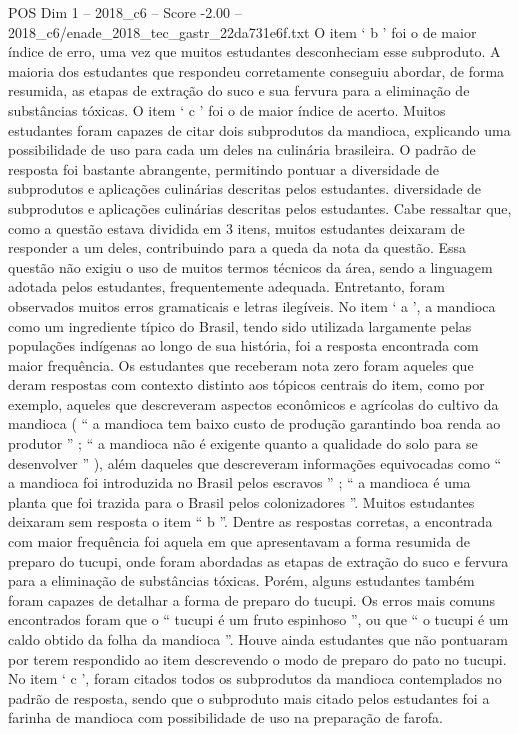 \begin{textsample}{POS Dim 1 – 2018\_c6 – Score -2.00 – 2018\_c6/enade\_2018\_tec\_gastr\_22da731e6f.txt}
O item ‘ b ’ foi o de maior índice de erro, uma vez que muitos estudantes desconheciam esse subproduto.
A maioria dos estudantes que respondeu corretamente conseguiu abordar, de forma resumida, as etapas de extração do suco e sua fervura para a eliminação de substâncias tóxicas.
O item ‘ c ’ foi o de maior índice de acerto.
Muitos estudantes foram capazes de citar dois subprodutos da mandioca, explicando uma possibilidade de uso para cada um deles na culinária brasileira.
O padrão de resposta foi bastante abrangente, permitindo pontuar a diversidade de subprodutos e aplicações culinárias descritas pelos estudantes. diversidade de subprodutos e aplicações culinárias descritas pelos estudantes.
Cabe ressaltar que, como a questão estava dividida em 3 itens, muitos estudantes deixaram de responder a um deles, contribuindo para a queda da nota da questão.
Essa questão não exigiu o uso de muitos termos técnicos da área, sendo a linguagem adotada pelos estudantes, frequentemente adequada.
Entretanto, foram observados muitos erros gramaticais e letras ilegíveis.
No item ‘ a ’, a mandioca como um ingrediente típico do Brasil, tendo sido utilizada largamente pelas populações indígenas ao longo de sua história, foi a resposta encontrada com maior frequência.
Os estudantes que receberam nota zero foram aqueles que deram respostas com contexto distinto aos tópicos centrais do item, como por exemplo, aqueles que descreveram aspectos econômicos e agrícolas do cultivo da mandioca ( “ a mandioca tem baixo custo de produção garantindo boa renda ao produtor ” ; “ a mandioca não é exigente quanto a qualidade do solo para se desenvolver ” ), além daqueles que descreveram informações equivocadas como “ a mandioca foi introduzida no Brasil pelos escravos ” ; “ a mandioca é uma planta que foi trazida para o Brasil pelos colonizadores ”.
Muitos estudantes deixaram sem resposta o item “ b ”.
Dentre as respostas corretas, a encontrada com maior frequência foi aquela em que apresentavam a forma resumida de preparo do tucupi, onde foram abordadas as etapas de extração do suco e fervura para a eliminação de substâncias tóxicas.
Porém, alguns estudantes também foram capazes de detalhar a forma de preparo do tucupi.
Os erros mais comuns encontrados foram que o “ tucupi é um fruto espinhoso ”, ou que “ o tucupi é um caldo obtido da folha da mandioca ”.
Houve ainda estudantes que não pontuaram por terem respondido ao item descrevendo o modo de preparo do pato no tucupi.
No item ‘ c ’, foram citados todos os subprodutos da mandioca contemplados no padrão de resposta, sendo que o subproduto mais citado pelos estudantes foi a farinha de mandioca com possibilidade de uso na preparação de farofa.

\end{textsample}
